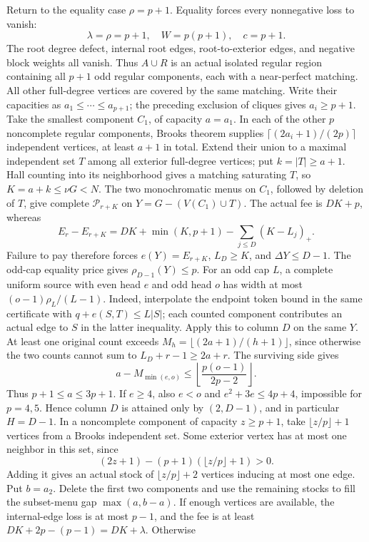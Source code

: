 \documentclass[11pt,a4paper]{article}
\newcommand{\p}{\mathcal P}
\theoremstyle{definition}
\begin{document}
Return to the equality case $\rho=p+1$. Equality forces every nonnegative loss to vanish:
\[
 \lambda=\rho=p+1,\quad W=p(p+1),\quad c=p+1.
\]
The root degree defect, internal root edges, root-to-exterior edges, and negative block weights all vanish. Thus $A\cup R$ is an actual isolated regular region containing all $p+1$ odd regular components, each with a near-perfect matching. All other full-degree vertices are covered by the same matching. Write their capacities as $a_1\le\cdots\le a_{p+1}$; the preceding exclusion of cliques gives $a_i\ge p+1$.
Take the smallest component $C_1$, of capacity $a=a_1$. In each of the other $p$ noncomplete regular components, Brooks theorem supplies $\lceil(2a_i+1)/(2p)\rceil$ independent vertices, at least $a+1$ in total. Extend their union to a maximal independent set $T$ among all exterior full-degree vertices; put $k=|T|\ge a+1$. Hall counting into its neighborhood gives a matching saturating $T$, so $K=a+k\le\nu G<N$. The two monochromatic menus on $C_1$, followed by deletion of $T$, give complete $\p_{r+K}$ on $Y=G-(V(C_1)\cup T)$. The actual fee is $DK+p$, whereas
\[
 E_r-E_{r+K}=DK+\min(K,p+1)-\sum_{j\le D}(K-L_j)_+.
\]
Failure to pay therefore forces $e(Y)=E_{r+K}$, $L_D\ge K$, and $\Delta Y\le D-1$. The odd-cap equality price gives $\rho_{D-1}(Y)\le p$.
For an odd cap $L$, a complete uniform source with even head $e$ and odd head $o$ has width at most $(o-1)\rho_L/(L-1)$. Indeed, interpolate the endpoint token bound in the same certificate with $q+e(S,T)\le L|S|$; each counted component contributes an actual edge to $S$ in the latter inequality. Apply this to column $D$ on the same $Y$. At least one original count exceeds $M_h=\lfloor(2a+1)/(h+1)\rfloor$, since otherwise the two counts cannot sum to $L_D+r-1\ge2a+r$. The surviving side gives
\[
 a-M_{\min(e,o)}\le\left\lfloor\frac{p(o-1)}{2p-2}\right\rfloor.
\]
Thus $p+1\le a\le3p+1$. If $e\ge4$, also $e<o$ and $e^2+3e\le4p+4$, impossible for $p=4,5$. Hence column $D$ is attained only by $(2,D-1)$, and in particular $H=D-1$.
In a noncomplete component of capacity $z\ge p+1$, take $\lfloor z/p\rfloor+1$ vertices from a Brooks independent set. Some exterior vertex has at most one neighbor in this set, since
\[
 (2z+1)-(p+1)(\lfloor z/p\rfloor+1)>0.
\]
Adding it gives an actual stock of $\lfloor z/p\rfloor+2$ vertices inducing at most one edge. Put $b=a_2$. Delete the first two components and use the remaining stocks to fill the subset-menu gap $\max(a,b-a)$. If enough vertices are available, the internal-edge loss is at most $p-1$, and the fee is at least $DK+2p-(p-1)=DK+\lambda$. Otherwise
\end{document}
